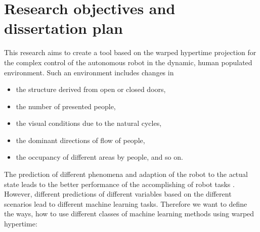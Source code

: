 \section{Research objectives and dissertation plan}

This research aims to create a tool based on the warped hypertime projection for the complex control of the autonomous robot in the dynamic, human populated environment.
Such an environment includes changes in 
\begin{itemize}
    \item the structure derived from open or closed doors,
    \item the number of presented people,
    \item the visual conditions due to the natural cycles,
    \item the dominant directions of flow of people,
    \item the occupancy of different areas by people, and so on.
\end{itemize}
The prediction of different phenomena and adaption of the robot to the actual state leads to the better performance of the accomplishing of robot tasks \cite{hawes2017strands}.
However, different predictions of different variables based on the different scenarios lead to different machine learning tasks.
Therefore we want to define the ways, how to use different classes of machine learning methods using warped hypertime:
